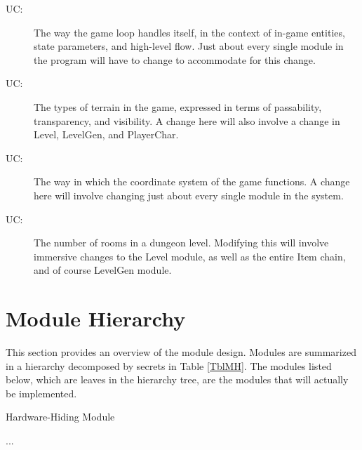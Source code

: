 \documentclass[12pt, titlepage]{article}
\newcommand{\newSection}[1]{
  \newpage
  \section{#1}
}
\newcounter{ucnum}
\newcommand{\uctheucnum}{UC\theucnum}
\newcounter{mnum}
\newcommand{\mthemnum}{M\themnum}
\begin{document}
        \bigskip\begin{description}
            \item[ \uctheucnum \label{ucMasterCtrl}:] The way the game loop handles itself, in the context of in-game entities, state parameters, and high-level flow. Just about every single module in the program will have to change to accommodate for this change.
            \item[ \uctheucnum \label{ucTerrain}:] The types of terrain in the game, expressed in terms of passability, transparency, and visibility. A change here will also involve a change in Level, LevelGen, and PlayerChar.
            \item[ \uctheucnum \label{ucCoord}:] The way in which the coordinate system of the game functions. A change here will involve changing just about every single module in the system.
            \item[ \uctheucnum \label{ucRooms}:] The number of rooms in a dungeon level. Modifying this will involve immersive changes to the Level module, as well as the entire Item chain, and of course LevelGen module.
        \end{description}

\newSection{Module Hierarchy} \label{SecMH}

    This section provides an overview of the module design. Modules are summarized in a hierarchy decomposed by secrets in Table \ref{TblMH}. The modules listed below, which are leaves in the hierarchy tree, are the modules that will actually be implemented.

    \bigskip\begin{description}
    \item [ \mthemnum \label{mHH}:] Hardware-Hiding Module
    \item ...
    \end{description}
\end{document}
